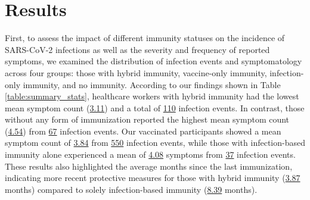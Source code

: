 \documentclass[11pt]{article}
\begin{document}
\section*{Results}
First, to assess the impact of different immunity statuses on the incidence of SARS-CoV-2 infections as well as the severity and frequency of reported symptoms, we examined the distribution of infection events and symptomatology across four groups: those with hybrid immunity, vaccine-only immunity, infection-only immunity, and no immunity. According to our findings shown in Table \ref{table:summary_stats}, healthcare workers with hybrid immunity had the lowest mean symptom count (\hyperlink{A0b}{3.11}) and a total of \hyperlink{A0a}{110} infection events. In contrast, those without any form of immunization reported the highest mean symptom count (\hyperlink{A2b}{4.54}) from \hyperlink{A2a}{67} infection events. Our vaccinated participants showed a mean symptom count of \hyperlink{A3b}{3.84} from \hyperlink{A3a}{550} infection events, while those with infection-based immunity alone experienced a mean of \hyperlink{A1b}{4.08} symptoms from \hyperlink{A1a}{37} infection events. These results also highlighted the average months since the last immunization, indicating more recent protective measures for those with hybrid immunity (\hyperlink{A0c}{3.87} months) compared to solely infection-based immunity (\hyperlink{A1c}{8.39} months).
\end{document}
